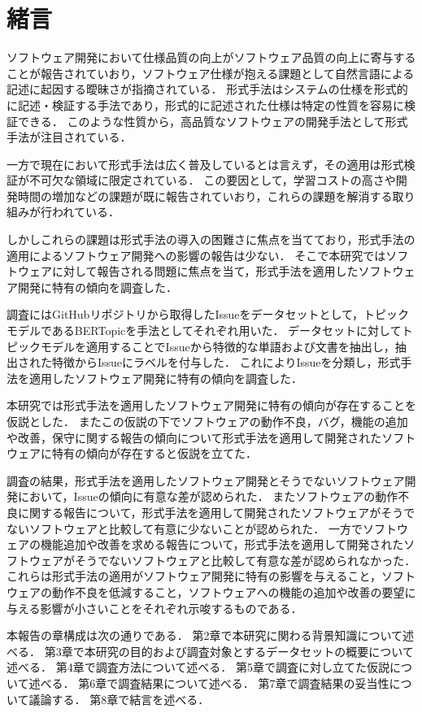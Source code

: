 \documentclass[main]{subfiles}
\begin{document}
\chapter{緒言}

ソフトウェア開発において仕様品質の向上がソフトウェア品質の向上に寄与することが報告されていおり\cite{knauss:2009}，ソフトウェア仕様が抱える課題として自然言語による記述に起因する曖昧さが指摘されている\cite{kamsties:2005}．
形式手法はシステムの仕様を形式的に記述・検証する手法であり，形式的に記述された仕様は特定の性質を容易に検証できる．
このような性質から，高品質なソフトウェアの開発手法として形式手法が注目されている\cite{aoki:2018}．

一方で現在において形式手法は広く普及しているとは言えず，その適用は形式検証が不可欠な領域に限定されている．
この要因として，学習コストの高さや開発時間の増加などの課題が既に報告されていおり\cite{reid:2020,kitamura:2021}，これらの課題を解消する取り組みが行われている\cite{huisman:2020,ohnishi:2020}．

しかしこれらの課題は形式手法の導入の困難さに焦点を当てており，形式手法の適用によるソフトウェア開発への影響の報告は少ない．
そこで本研究ではソフトウェアに対して報告される問題に焦点を当て，形式手法を適用したソフトウェア開発に特有の傾向を調査した．

調査にはGitHubリポジトリから取得したIssueをデータセットとして，トピックモデルであるBERTopic\cite{grootendorst:2022}を手法としてそれぞれ用いた．
データセットに対してトピックモデルを適用することでIssueから特徴的な単語および文書を抽出し，抽出された特徴からIssueにラベルを付与した．
これによりIssueを分類し，形式手法を適用したソフトウェア開発に特有の傾向を調査した．

本研究では形式手法を適用したソフトウェア開発に特有の傾向が存在することを仮説とした．
またこの仮説の下でソフトウェアの動作不良，バグ，機能の追加や改善，保守に関する報告の傾向について形式手法を適用して開発されたソフトウェアに特有の傾向が存在すると仮説を立てた．

調査の結果，形式手法を適用したソフトウェア開発とそうでないソフトウェア開発において，Issueの傾向に有意な差が認められた．
またソフトウェアの動作不良に関する報告について，形式手法を適用して開発されたソフトウェアがそうでないソフトウェアと比較して有意に少ないことが認められた．
一方でソフトウェアの機能追加や改善を求める報告について，形式手法を適用して開発されたソフトウェアがそうでないソフトウェアと比較して有意な差が認められなかった．
これらは形式手法の適用がソフトウェア開発に特有の影響を与えること，ソフトウェアの動作不良を低減すること，ソフトウェアへの機能の追加や改善の要望に与える影響が小さいことをそれぞれ示唆するものである．

本報告の章構成は次の通りである．
第2章で本研究に関わる背景知識について述べる．
第3章で本研究の目的および調査対象とするデータセットの概要について述べる．
第4章で調査方法について述べる．
第5章で調査に対し立てた仮説について述べる．
第6章で調査結果について述べる．
第7章で調査結果の妥当性について議論する．
第8章で結言を述べる．
\end{document}
